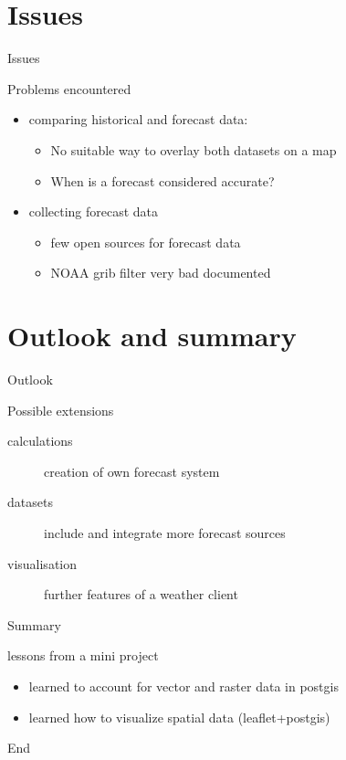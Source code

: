 \documentclass[ucs,9pt]{beamer}
\begin{document}
\section{Issues}
\begin{frame}{Issues}
	\begin{block}{Problems encountered}
		\begin{itemize}
			\item comparing historical and forecast data:
				\begin{itemize}
					\item No suitable way to overlay both datasets on a map
					\item When is a forecast considered accurate?
				\end{itemize}
			\item collecting forecast data
				\begin{itemize}
					\item few open sources for forecast data
					\item NOAA grib filter very bad documented 
				\end{itemize}
		\end{itemize}
	\end{block}
\end{frame}

\section{Outlook and summary}
\begin{frame}{Outlook}
		\begin{block}{Possible extensions}
			\begin{description}
				\item [calculations] creation of own forecast system
				\item [datasets] include and integrate more forecast sources
				\item [visualisation] further features of a weather client
			\end{description}
		\end{block}
\end{frame}

\begin{frame}{Summary}
	\begin{block}{lessons from a mini project}
			\begin{itemize}
				\item learned to account for vector and raster data in postgis
				\item learned how to visualize spatial data (leaflet+postgis)
			\end{itemize}
	\end{block}
\end{frame}

\begin{frame}{End}
  \\
  \\
\end{frame}
\end{document}
